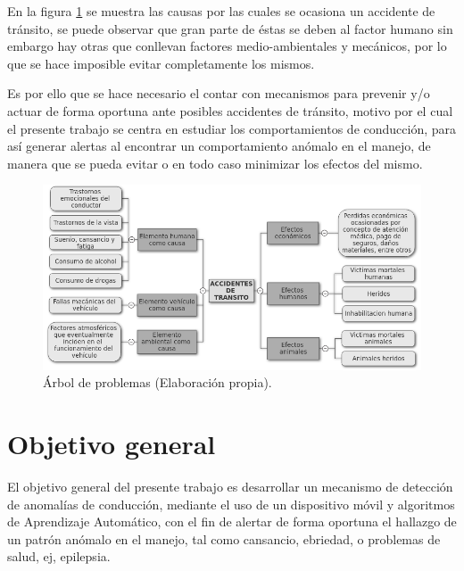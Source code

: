 En la figura \ref{fig:arbol} se muestra las causas por las cuales se ocasiona un accidente de tr\'{a}nsito, se puede observar que gran parte de \'{e}stas se deben al factor humano sin embargo hay otras que conllevan factores medio-ambientales y mec\'{a}nicos, por lo que se hace imposible evitar completamente los mismos. 

\vspace{5mm} %

Es por ello que se hace necesario el contar con mecanismos para prevenir y/o actuar de forma oportuna ante posibles accidentes de tr\'{a}nsito, motivo por el cual el presente trabajo se centra en estudiar los comportamientos de conducci\'{o}n, para as\'{i} generar alertas al encontrar un comportamiento an\'{o}malo en el manejo, de manera que se pueda evitar o en todo caso minimizar los efectos del mismo.

\begin{figure}[h!]
  \begin{center}	\includegraphics[width=1.0\textwidth, fbox]{imagenes/Cap1/arbol_p}
  \caption{\'{A}rbol de problemas (Elaboraci\'{o}n propia).}
  \label{fig:arbol}
  \end{center}
\end{figure}


\section{Objetivo general}

El objetivo general del presente trabajo es desarrollar un mecanismo de detecci\'{o}n de anomal\'{i}as de conducción, mediante el uso de un dispositivo móvil y algoritmos de Aprendizaje Automático, con el fin de alertar de forma oportuna el hallazgo de un patrón anómalo en el manejo, tal como cansancio, ebriedad, o problemas de salud, ej, epilepsia.

